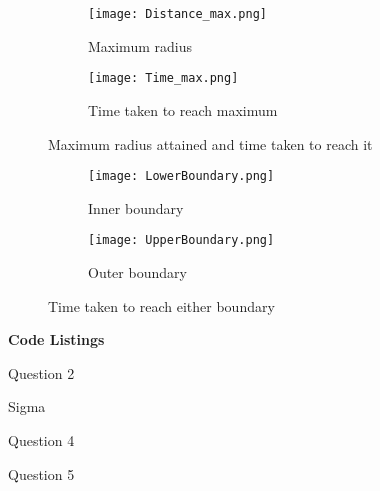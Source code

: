 \documentclass[12pt]{extarticle}
\begin{document}
\begin{figure}[!htbp]
    \centering
    \begin{subfigure}[b]{0.47\textwidth}
        \texttt{[image: Distance\_max.png]}
        \caption{Maximum radius}
        \label{figure:8a}
    \end{subfigure}  
    \qquad
    \begin{subfigure}[b]{0.47\textwidth}
        \texttt{[image: Time\_max.png]}
        \caption{Time taken to reach maximum}
        \label{figure:8b}
    \end{subfigure}
    \caption{Maximum radius attained and time taken to reach it}
    \label{figure 8}
\end{figure}

\begin{figure}[!htbp]
    \centering
    \begin{subfigure}[b]{0.47\textwidth}
        \texttt{[image: LowerBoundary.png]}
        \caption{Inner boundary}
        \label{figure:9a}
    \end{subfigure}  
    \qquad
    \begin{subfigure}[b]{0.47\textwidth}
        \texttt{[image: UpperBoundary.png]}
        \caption{Outer boundary}
        \label{figure:9b}
    \end{subfigure}
    \caption{Time taken to reach either boundary}
    \label{figure 9}
\end{figure}

\pagebreak

\begin{center}
\textbf{Code Listings}
\end{center}

\begin{center}
Question 2
\end{center}


\begin{center}
Sigma
\end{center}


\begin{center}
Question 4
\end{center}


\begin{center}
Question 5
\end{center}

\end{document}
